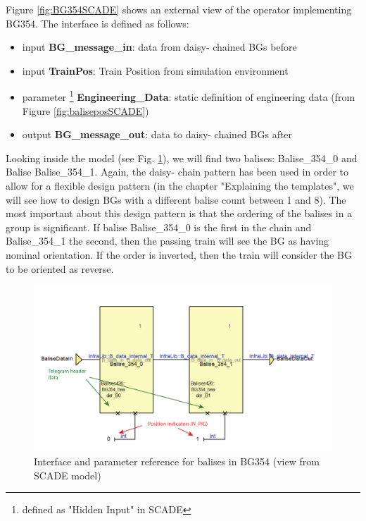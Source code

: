\documentclass{template/openetcs_article}
\begin{document}
Figure \ref{fig:BG354SCADE} shows an external view of the operator implementing BG354.\newline
The interface is defined as follows:
\begin{itemize}
 \item input \textbf{BG\_message\_in}: data from daisy- chained BGs before
 \item input \textbf{TrainPos}: Train Position from simulation environment
 \item parameter \footnote{defined as "Hidden Input" in SCADE} \textbf{Engineering\_Data}: static definition of engineering data (from Figure \ref{fig:baliseposSCADE})
 \item output \textbf{BG\_message\_out}: data to daisy- chained BGs after
\end{itemize}
Looking inside the model (see Fig. \ref{fig:balisesBG354SCADE}), we will find two balises: Balise\_354\_0 and Balise Balise\_354\_1. Again, the daisy- chain pattern has been used in order to allow for a flexible design pattern (in the chapter "Explaining the templates", we will see how to design BGs with a different balise count between 1 and 8).\newline
The most important about this design pattern is that the ordering of the balises in a group is significant. If balise Balise\_354\_0 is the first in the chain and Balise\_354\_1 the second, then the passing train will see the BG as having nominal orientation. If the order is inverted, then the train will consider the BG to be oriented as reverse.

\begin{figure}[H]
  \centering
  \includegraphics[width=5in]{images/BalisesInBG354}
  \caption{Interface and parameter reference for balises in BG354 (view from SCADE model)}
  \label{fig:balisesBG354SCADE}
\end{figure}
\end{document}
